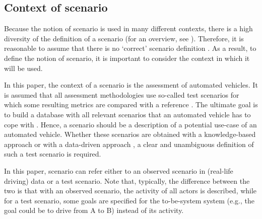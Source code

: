 \subsection{Context of scenario}
\label{sec:context}

Because the notion of scenario is used in many different contexts, there is a high diversity of the definition of a scenario (for an overview, see \cite{vannotten2003updated, bishop2007scentechniques}). Therefore, it is reasonable to assume that there is no `correct' scenario definition \cite{vannotten2003updated}. As a result, to define the notion of scenario, it is important to consider the context in which it will be used.

In this paper, the context of a scenario is the assessment of automated vehicles. It is assumed that all assessment methodologies use so-called test scenarios for which some resulting metrics are compared with a reference \cite{stellet2015taxonomy}. 
The ultimate goal is to build a database with all relevant scenarios that an automated vehicle has to cope with \cite{putz2017pegasus}. Hence, a scenario should be a description of a potential use-case of an automated vehicle. 
Whether these scenarios are obtained with a knowledge-based approach \cite{gietelink2004systemvalidation, stellet2015taxonomy} or with a data-driven approach \cite{deGelder2017assessment, stellet2015taxonomy}, a clear and unambiguous definition of such a test scenario is required. 

In this paper, scenario can refer either to an observed scenario in (real-life driving) data or a test scenario. Note that, typically, the difference between the two is that with an observed scenario, the activity of all actors is described, while for a test scenario, some goals are specified for the to-be-system system (e.g., the goal could be to drive from A to B) instead of its activity. 

